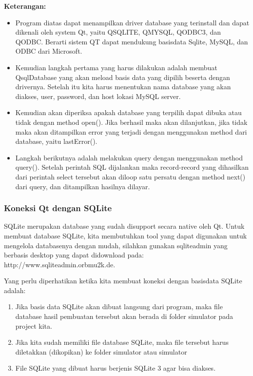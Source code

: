 \textbf{Keterangan:}

\begin{itemize}
\tightlist
\item
  Program diatas dapat menampilkan driver database yang terinstall dan
  dapat dikenali oleh system Qt, yaitu QSQLITE, QMYSQL, QODBC3, dan
  QODBC. Berarti sistem QT dapat mendukung basisdata Sqlite, MySQL, dan
  ODBC dari Microsoft.
\item
  Kemudian langkah pertama yang harus dilakukan adalah membuat
  QsqlDatabase yang akan meload basis data yang dipilih beserta dengan
  drivernya. Setelah itu kita harus menentukan nama database yang akan
  diakses, user, password, dan host lokasi MySQL server.
\item
  Kemudian akan diperiksa apakah database yang terpilih dapat dibuka
  atau tidak dengan method open(). Jika berhasil maka akan dilanjutkan,
  jika tidak maka akan ditampilkan error yang terjadi dengan menggunakan
  method dari database, yaitu lastError().
\item
  Langkah berikutnya adalah melakukan query dengan menggunakan method
  query(). Setelah perintah SQL dijalankan maka record-record yang
  dihasilkan dari perintah select tersebut akan diloop satu persatu
  dengan method next() dari query, dan ditampilkan hasilnya dilayar.
\end{itemize}

\subsubsection{Koneksi Qt dengan SQLite}\label{koneksi-qt-dengan-sqlite}

SQLite merupakan database yang sudah disupport secara native oleh Qt.
Untuk membuat database SQLite, kita membutuhkan tool yang dapat
digunakan untuk mengelola databasenya dengan mudah, silahkan gunakan
sqliteadmin yang berbasis desktop yang dapat didownload pada:
http://www.sqliteadmin.orbmu2k.de.

Yang perlu diperhatikan ketika kita membuat koneksi dengan basisdata
SQLite adalah:

\begin{enumerate}
\def\labelenumi{\arabic{enumi}.}
\tightlist
\item
  Jika basis data SQLite akan dibuat langsung dari program, maka file
  database hasil pembuatan tersebut akan berada di folder simulator pada
  project kita.
\item
  Jika kita sudah memiliki file database SQLite, maka file tersebut
  harus diletakkan (dikopikan) ke folder simulator atau simulator\debug
\item
  File SQLite yang dibuat harus berjenis SQLite 3 agar bisa diakses.
\end{enumerate}

